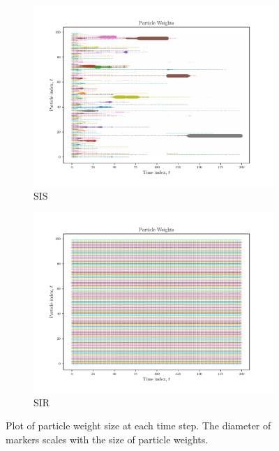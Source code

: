 \documentclass{article}
\begin{document}
\begin{figure}
    \begin{subfigure}{.5\textwidth}
        \includegraphics[width=1.15\textwidth]{Figures/particle_weights_sis.pdf}
        \caption{SIS}
        \label{fig:sis-particle-weights}
    \end{subfigure}
    \begin{subfigure}{.5\textwidth}
        \includegraphics[width=1.15\textwidth]{Figures/particle_weights_sir.pdf}
        \caption{SIR}
        \label{fig:sir-particle-weights}
    \end{subfigure}
    \caption{Plot of particle weight size at each time step. The diameter of markers scales with the size of particle weights.}
    \label{fig:particle-weights}
\end{figure}
\end{document}
